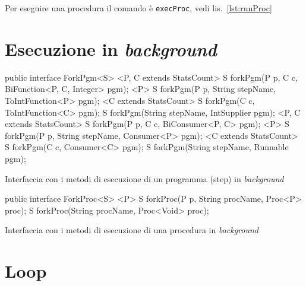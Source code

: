 Per eseguire una procedura il comando è \texttt{execProc}, vedi
lis.~\ref{lst:runProc}


\section{Esecuzione in \textit{background}} \label{sec:fork}

\begin{elisting}[!htb]
    \begin{javacode}
        public interface ForkPgm<S> {
    <P, C extends StatsCount> S forkPgm(P p, C c, BiFunction<P, C, Integer> pgm);
    <P> S forkPgm(P p, String stepName, ToIntFunction<P> pgm);
    <C extends StatsCount> S forkPgm(C c, ToIntFunction<C> pgm);
    S forkPgm(String stepName, IntSupplier pgm);
    <P, C extends StatsCount> S forkPgm(P p, C c, BiConsumer<P, C> pgm);
    <P> S forkPgm(P p, String stepName, Consumer<P> pgm);
    <C extends StatsCount> S forkPgm(C c, Consumer<C> pgm);
    S forkPgm(String stepName, Runnable pgm);
}
    \end{javacode}
    \caption{Interfaccia con i metodi di esecuzione di un programma (step) in \textit{background}}
    \label{lst:forkPgm}
\end{elisting}

\begin{elisting}[!htb]
    \begin{javacode}
        public interface ForkProc<S> {
    <P> S forkProc(P p, String procName, Proc<P> proc);
    S forkProc(String procName, Proc<Void> proc);
}
    \end{javacode}
    \caption{Interfaccia con i metodi di esecuzione di una procedura in \textit{background}}
    \label{lst:forkProc}
\end{elisting}


\section{Loop} \label{sec:loop}


